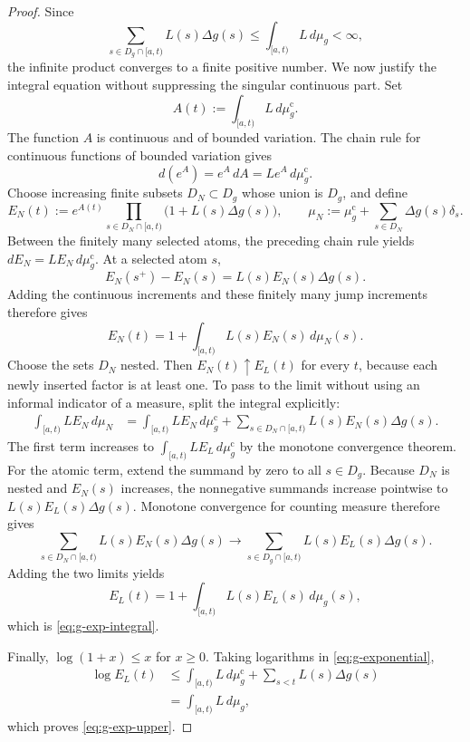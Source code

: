 \documentclass[preprint,12pt]{elsarticle}
\newenvironment{revision}{\begingroup\color{red}}{\endgroup}
\newenvironment{revision}{}{}
\theoremstyle{definition}
\theoremstyle{remark}
\begin{document}
\begin{proof}
Since
\[
 \sum_{s\in D_g\cap[a,t)}L(s)\Delta g(s)
 \le\int_{[a,t)}L\,d\mu_g<\infty,
\]
the infinite product converges to a finite positive number. We now justify the integral equation without suppressing the singular continuous part. Set
\[
 A(t):=\int_{[a,t)}L\,d\mu_g^{\mathrm c}.
\]
The function $A$ is continuous and of bounded variation. The chain rule for continuous functions of bounded variation gives
\[
 d(e^A)=e^A\,dA=L e^A\,d\mu_g^{\mathrm c}.
\]
Choose increasing finite subsets $D_N\subset D_g$ whose union is $D_g$, and define
\[
 E_N(t):=e^{A(t)}\prod_{s\in D_N\cap[a,t)}
          \bigl(1+L(s)\Delta g(s)\bigr),
 \qquad
 \mu_N:=\mu_g^{\mathrm c}+\sum_{s\in D_N}\Delta g(s)\delta_s.
\]
Between the finitely many selected atoms, the preceding chain rule yields
$dE_N=L E_N\,d\mu_g^{\mathrm c}$. At a selected atom $s$,
\[
 E_N(s^+)-E_N(s)=L(s)E_N(s)\Delta g(s).
\]
Adding the continuous increments and these finitely many jump increments therefore gives
\[
 E_N(t)=1+\int_{[a,t)}L(s)E_N(s)\,d\mu_N(s).
\]
\begin{revision}
Choose the sets \(D_N\) nested.  Then \(E_N(t)\uparrow E_L(t)\) for every
\(t\), because each newly inserted factor is at least one.  To pass to the limit
without using an informal indicator of a measure, split the integral explicitly:
\begin{align*}
 \int_{[a,t)}LE_N\,d\mu_N
 &=\int_{[a,t)}LE_N\,d\mu_g^{\mathrm c}
   +\sum_{s\in D_N\cap[a,t)}
      L(s)E_N(s)\Delta g(s).
\end{align*}
The first term increases to
\(\int_{[a,t)}LE_L\,d\mu_g^{\mathrm c}\) by the monotone convergence theorem.
For the atomic term, extend the summand by zero to all \(s\in D_g\).  Because
\(D_N\) is nested and \(E_N(s)\) increases, the nonnegative summands increase
pointwise to \(L(s)E_L(s)\Delta g(s)\).  Monotone convergence for counting
measure therefore gives
\[
 \sum_{s\in D_N\cap[a,t)}L(s)E_N(s)\Delta g(s)
 \longrightarrow
 \sum_{s\in D_g\cap[a,t)}L(s)E_L(s)\Delta g(s).
\]
Adding the two limits yields
\end{revision}
\[
 E_L(t)=1+\int_{[a,t)}L(s)E_L(s)\,d\mu_g(s),
\]
which is \eqref{eq:g-exp-integral}.

Finally, $\log(1+x)\le x$ for $x\ge0$. Taking logarithms in \eqref{eq:g-exponential},
\begin{align*}
 \log E_L(t)
 &\le\int_{[a,t)}L\,d\mu_g^{\mathrm c}
 +\sum_{s<t}L(s)\Delta g(s)\\
 &=\int_{[a,t)}L\,d\mu_g,
\end{align*}
which proves \eqref{eq:g-exp-upper}.
\end{proof}
\end{document}
